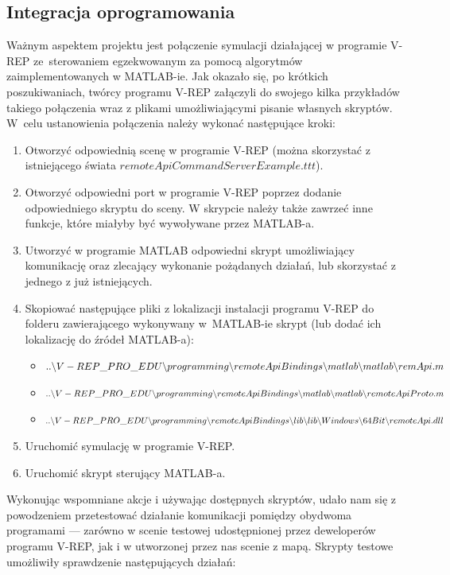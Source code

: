 \documentclass[11pt, a4paper, twoside]{report}
\begin{document}
\subsection{Integracja oprogramowania}
\label{subsec:integracja}
Ważnym aspektem projektu jest połączenie symulacji działającej w programie V-REP ze~sterowaniem egzekwowanym za pomocą algorytmów zaimplementowanych w MATLAB-ie. Jak okazało się, po krótkich poszukiwaniach, twórcy programu V-REP załączyli do swojego kilka przykładów takiego połączenia wraz z plikami umożliwiającymi pisanie własnych skryptów. W~celu ustanowienia połączenia należy wykonać następujące kroki:
\begin{enumerate}[1)]
	\item Otworzyć odpowiednią scenę w programie V-REP (można skorzystać z istniejącego świata $remoteApiCommandServerExample.ttt$).
	\item Otworzyć odpowiedni port w programie V-REP poprzez dodanie odpowiedniego skryptu do sceny. W skrypcie należy także zawrzeć inne funkcje, które miałyby być wywoływane przez MATLAB-a.
	\item Utworzyć w programie MATLAB odpowiedni skrypt umożliwiający komunikację oraz zlecający wykonanie pożądanych działań, lub skorzystać z jednego z już istniejących.
	\item Skopiować następujące pliki z lokalizacji instalacji programu V-REP do folderu zawierającego wykonywany w~MATLAB-ie skrypt (lub dodać ich lokalizację do źródeł MATLAB-a):
	\begin{itemize}
		\item $..\backslash V-REP\_PRO\_EDU\backslash programming\backslash remoteApiBindings\backslash \\matlab\backslash matlab\backslash remApi.m$
		\item $..\backslash V-REP\_PRO\_EDU\backslash programming\backslash remoteApiBindings\backslash \\matlab\backslash matlab\backslash remoteApiProto.m$
		\item $..\backslash V-REP\_PRO\_EDU\backslash programming\backslash remoteApiBindings\backslash \\lib\backslash lib\backslash Windows\backslash 64Bit\backslash remoteApi.dll$
	\end{itemize}
	\item Uruchomić symulację w programie V-REP.
	\item Uruchomić skrypt sterujący MATLAB-a.
\end{enumerate}
Wykonując wspomniane akcje i używając dostępnych skryptów, udało nam się z powodzeniem przetestować działanie komunikacji pomiędzy obydwoma programami --- zarówno w scenie testowej udostępnionej przez deweloperów programu V-REP, jak i w utworzonej przez nas scenie z mapą. Skrypty testowe umożliwiły sprawdzenie następujących działań:
\end{document}
